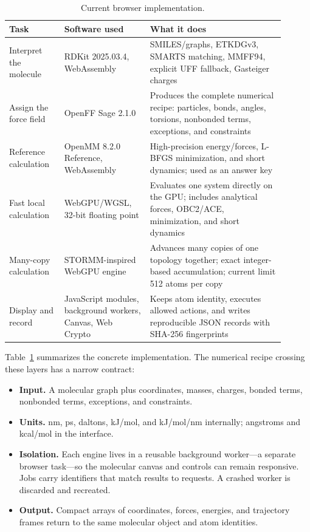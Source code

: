 \begin{table}[htbp]
  \centering
  \caption{Current browser implementation.}
  \label{tab:architecture-runtime}
  \footnotesize
  \renewcommand{\arraystretch}{1.08}
  \begin{tabular}{@{}>{\raggedright\arraybackslash}p{0.18\linewidth}
                       >{\raggedright\arraybackslash}p{0.28\linewidth}
                       >{\raggedright\arraybackslash}p{0.44\linewidth}@{}}
    \toprule
    Task & Software used & What it does \\
    \midrule
    Interpret the molecule & RDKit 2025.03.4, WebAssembly &
      SMILES/graphs, ETKDGv3, SMARTS matching, MMFF94, explicit UFF fallback,
      Gasteiger charges \\
    Assign the force field & OpenFF Sage 2.1.0 &
      Produces the complete numerical recipe: particles, bonds, angles,
      torsions, nonbonded terms, exceptions, and constraints \\
    Reference calculation & OpenMM 8.2.0 Reference, WebAssembly &
      High-precision energy/forces, L-BFGS minimization, and short dynamics;
      used as an answer key \\
    Fast local calculation & WebGPU/WGSL, 32-bit floating point &
      Evaluates one system directly on the GPU; includes analytical forces,
      OBC2/ACE, minimization, and short dynamics \\
    Many-copy calculation & STORMM-inspired WebGPU engine &
      Advances many copies of one topology together; exact integer-based
      accumulation; current limit 512 atoms per copy \\
    Display and record & JavaScript modules, background workers, Canvas,
      Web Crypto & Keeps atom identity, executes allowed actions, and writes
      reproducible JSON records with SHA-256 fingerprints \\
    \bottomrule
  \end{tabular}
\end{table}

Table~\ref{tab:architecture-runtime} summarizes the concrete implementation.
The numerical recipe crossing these layers has a narrow contract:

\begin{itemize}
  \item \textbf{Input.} A molecular graph plus coordinates, masses, charges,
    bonded terms, nonbonded terms, exceptions, and constraints.
  \item \textbf{Units.} nm, ps, daltons, kJ/mol, and kJ/mol/nm internally;
    angstroms and kcal/mol in the interface.
  \item \textbf{Isolation.} Each engine lives in a reusable background
    worker---a separate browser task---so the molecular canvas and controls can
    remain responsive. Jobs carry identifiers that match results to requests. A
    crashed worker is discarded and recreated.
  \item \textbf{Output.} Compact arrays of coordinates, forces, energies, and
    trajectory frames return to the same molecular object and atom identities.
\end{itemize}

